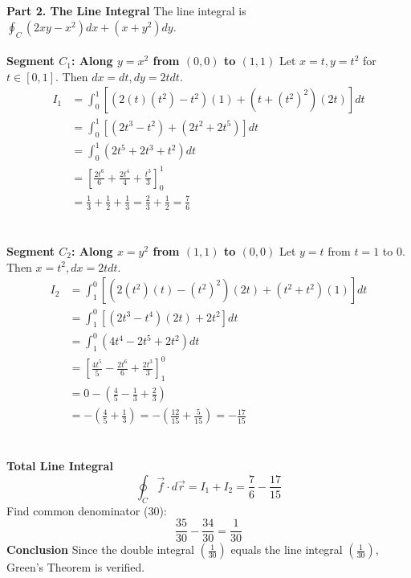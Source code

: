 \documentclass{article}
\begin{document}
\\
\\
\textbf{Part 2. The Line Integral}
The line integral is $\oint_C (2xy - x^2)dx + (x + y^2)dy$.
\\
\\
\textbf{Segment $C_1$: Along $y=x^2$ from $(0,0)$ to $(1,1)$}
Let $x=t, y=t^2$ for $t \in [0, 1]$. Then $dx=dt, dy=2t dt$.
\begin{align*}
	I_1 & = \int_0^1 \left[ (2(t)(t^2) - t^2)(1) + (t + (t^2)^2)(2t) \right] dt               \\
	    & = \int_0^1 \left[ (2t^3 - t^2) + (2t^2 + 2t^5) \right] dt                           \\
	    & = \int_0^1 (2t^5 + 2t^3 + t^2) dt                                                   \\
	    & = \left[ \frac{2t^6}{6} + \frac{2t^4}{4} + \frac{t^3}{3} \right]_0^1                \\
	    & = \frac{1}{3} + \frac{1}{2} + \frac{1}{3} = \frac{2}{3} + \frac{1}{2} = \frac{7}{6}
\end{align*}
\\
\\
\textbf{Segment $C_2$: Along $x=y^2$ from $(1,1)$ to $(0,0)$}
Let $y=t$ from $t=1$ to $0$. Then $x=t^2, dx=2t dt$.
\begin{align*}
	I_2 & = \int_1^0 \left[ (2(t^2)(t) - (t^2)^2)(2t) + (t^2 + t^2)(1) \right] dt                                       \\
	    & = \int_1^0 \left[ (2t^3 - t^4)(2t) + 2t^2 \right] dt                                                          \\
	    & = \int_1^0 (4t^4 - 2t^5 + 2t^2) dt                                                                            \\
	    & = \left[ \frac{4t^5}{5} - \frac{2t^6}{6} + \frac{2t^3}{3} \right]_1^0                                         \\
	    & = 0 - \left( \frac{4}{5} - \frac{1}{3} + \frac{2}{3} \right)                                                  \\
	    & = - \left( \frac{4}{5} + \frac{1}{3} \right) = - \left( \frac{12}{15} + \frac{5}{15} \right) = -\frac{17}{15}
\end{align*}
\\
\\
\textbf{Total Line Integral}
\[
	\oint_C \vec{f} \cdot d\vec{r} = I_1 + I_2 = \frac{7}{6} - \frac{17}{15}
\]
Find common denominator (30):
\[
	\frac{35}{30} - \frac{34}{30} = \frac{1}{30}
\]
\textbf{Conclusion}
Since the double integral $\left(\frac{1}{30}\right)$ equals the line integral
$\left(\frac{1}{30}\right)$, Green's Theorem is verified.
\end{document}
